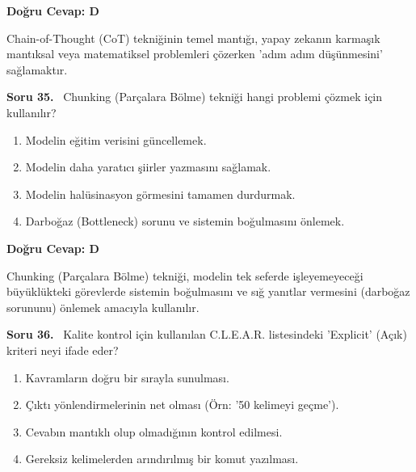 \documentclass[11pt,a4paper,openany]{book}
\begin{document}
\vspace{4pt}
\begin{tcolorbox}[title=Cevap ve Açıklama, colback=gray!3!white, colframe=primarycolor!90!black, arc=2mm, fonttitle=\bfseries\sffamily, top=6pt, bottom=6pt]
    \textbf{Doğru Cevap: D}

    \vspace{2pt}
    Chain-of-Thought (CoT) tekniğinin temel mantığı, yapay zekanın karmaşık mantıksal veya matematiksel problemleri çözerken 'adım adım düşünmesini' sağlamaktır.
\end{tcolorbox}
\vspace{10pt}
\needspace{5cm}
\vspace{8pt}
\noindent\textbf{\large\sffamily Soru 35.} \ Chunking (Parçalara Bölme) tekniği hangi problemi çözmek için kullanılır?

\begin{enumerate}[label=\Alph*), leftmargin=25pt, topsep=4pt, itemsep=2pt]
        \item Modelin eğitim verisini güncellemek.
        \item Modelin daha yaratıcı şiirler yazmasını sağlamak.
        \item Modelin halüsinasyon görmesini tamamen durdurmak.
        \item Darboğaz (Bottleneck) sorunu ve sistemin boğulmasını önlemek.
\end{enumerate}

\vspace{4pt}
\begin{tcolorbox}[title=Cevap ve Açıklama, colback=gray!3!white, colframe=primarycolor!90!black, arc=2mm, fonttitle=\bfseries\sffamily, top=6pt, bottom=6pt]
    \textbf{Doğru Cevap: D}

    \vspace{2pt}
    Chunking (Parçalara Bölme) tekniği, modelin tek seferde işleyemeyeceği büyüklükteki görevlerde sistemin boğulmasını ve sığ yanıtlar vermesini (darboğaz sorununu) önlemek amacıyla kullanılır.
\end{tcolorbox}
\vspace{10pt}
\needspace{5cm}
\vspace{8pt}
\noindent\textbf{\large\sffamily Soru 36.} \ Kalite kontrol için kullanılan C.L.E.A.R. listesindeki 'Explicit' (Açık) kriteri neyi ifade eder?

\begin{enumerate}[label=\Alph*), leftmargin=25pt, topsep=4pt, itemsep=2pt]
        \item Kavramların doğru bir sırayla sunulması.
        \item Çıktı yönlendirmelerinin net olması (Örn: '50 kelimeyi geçme').
        \item Cevabın mantıklı olup olmadığının kontrol edilmesi.
        \item Gereksiz kelimelerden arındırılmış bir komut yazılması.
\end{enumerate}
\end{document}

